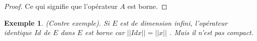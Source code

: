 \documentclass{report}
\newtheorem{Ex}{Exemple}[subsection]
\begin{document}
{\begin{proof}
Ce qui signifie que l'opérateur $A$ est borne.
\end{proof}




\begin{Ex} (Contre exemple). Si $E$ est de dimension infini, l'opérateur identique $Id$ de $E$ dans $E$ est borne car $||Id x|| = ||x||$ . Mais il n'est pas compact. \\
\end{Ex}

}
\end{document}
